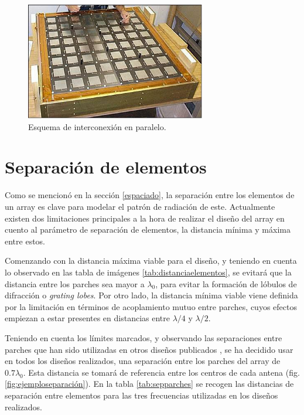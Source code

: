 \begin{figure}[p]
    \centering
        \includegraphics[width=0.7\textwidth]{archivos/array/arrayraro}
        \caption{Esquema de interconexión en paralelo. \cite{NASA2008}}
        \label{fig:nasafoto}
\end{figure}

\section{Separación de elementos}
\par Como se mencionó en la sección \ref{espaciado}, la separación entre los elementos de un array es clave para modelar el patrón de radiación de este. Actualmente existen dos limitaciones principales a la hora de realizar el diseño del array en cuento al parámetro de separación de elementos, la distancia mínima y máxima entre estos.
\\
\par Comenzando con la distancia máxima viable para el diseño, y teniendo en cuenta lo observado en las tabla de imágenes \ref{tab:distanciaelementos}, se evitará que la distancia entre los parches sea mayor a $\lambda_{0}$, para evitar la formación de lóbulos de difracción o \textit{grating lobes}. Por otro lado, la distancia mínima viable viene definida por la limitación en términos de acoplamiento mutuo entre parches, cuyos efectos empiezan a estar presentes en distancias entre $\lambda/4$ y $\lambda/2$.
\\
\par Teniendo en cuenta los límites marcados, y observando las separaciones entre parches que han sido utilizadas en otros diseños publicados \cite{Waterhouse2010, Bertol2017}, se ha decidido usar en todos los diseños realizados, una separación entre los parches del array de $0.7\lambda_{0}$. Esta distancia se tomará de referencia entre los centros de cada antena (fig. \ref{fig:ejemploseparación}). En la tabla \ref{tab:sepparches} se recogen las distancias de separación entre elementos para las tres frecuencias utilizadas en los diseños realizados. 

